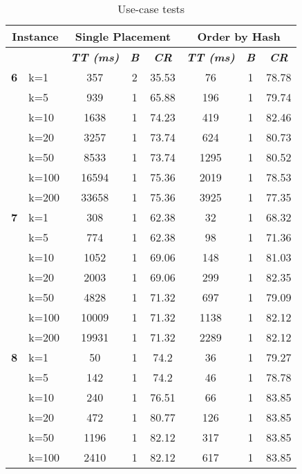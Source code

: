     \begin{table}[htbp]
    \caption{Use-case tests}
    \centering
    \begin{tabular}{|l|l|c|c|c|c|c|c|}
    
    \multicolumn{ 2}{|c|}{\textbf{Instance}} & \multicolumn{ 3}{c|}{\textbf{Single Placement}} & \multicolumn{ 3}{c|}{\textbf{Order by Hash}} \\ \hline
    \multicolumn{ 2}{|l|}{} & \textbf{\textit{TT (ms)}} & \textbf{\textit{B}} & \textbf{\textit{CR}} & \textbf{\textit{TT (ms)}} & \textbf{\textit{B}} & \textbf{\textit{CR}} \\ \hline
    \multicolumn{1}{|r|}{\textbf{6}} & k=1 & 357 & 2 & 35.53 & 76 & 1 & 78.78 \\ 
     & k=5 & 939 & 1 & 65.88 & 196 & 1 & 79.74 \\ 
     & k=10 & 1638 & 1 & 74.23 & 419 & 1 & 82.46 \\ 
     & k=20 & 3257 & 1 & 73.74 & 624 & 1 & 80.73 \\ 
     & k=50 & 8533 & 1 & 73.74 & 1295 & 1 & 80.52 \\ 
     & k=100 & 16594 & 1 & 75.36 & 2019 & 1 & 78.53 \\ 
     & k=200 & 33658 & 1 & 75.36 & 3925 & 1 & 77.35 \\ \hline
    \multicolumn{1}{|r|}{\textbf{7}} & k=1 & 308 & 1 & 62.38 & 32 & 1 & 68.32 \\ 
     & k=5 & 774 & 1 & 62.38 & 98 & 1 & 71.36 \\ 
     & k=10 & 1052 & 1 & 69.06 & 148 & 1 & 81.03 \\ 
     & k=20 & 2003 & 1 & 69.06 & 299 & 1 & 82.35 \\ 
     & k=50 & 4828 & 1 & 71.32 & 697 & 1 & 79.09 \\ 
     & k=100 & 10009 & 1 & 71.32 & 1138 & 1 & 82.12 \\ 
     & k=200 & 19931 & 1 & 71.32 & 2289 & 1 & 82.12 \\ \hline
    \multicolumn{1}{|r|}{\textbf{8}} & k=1 & 50 & 1 & 74.2 & 36 & 1 & 79.27 \\ 
     & k=5 & 142 & 1 & 74.2 & 46 & 1 & 78.78 \\ 
     & k=10 & 240 & 1 & 76.51 & 66 & 1 & 83.85 \\ 
     & k=20 & 472 & 1 & 80.77 & 126 & 1 & 83.85 \\ 
     & k=50 & 1196 & 1 & 82.12 & 317 & 1 & 83.85 \\ 
     & k=100 & 2410 & 1 & 82.12 & 617 & 1 & 83.85 \\ 

\end{tabular}
\end{table}
